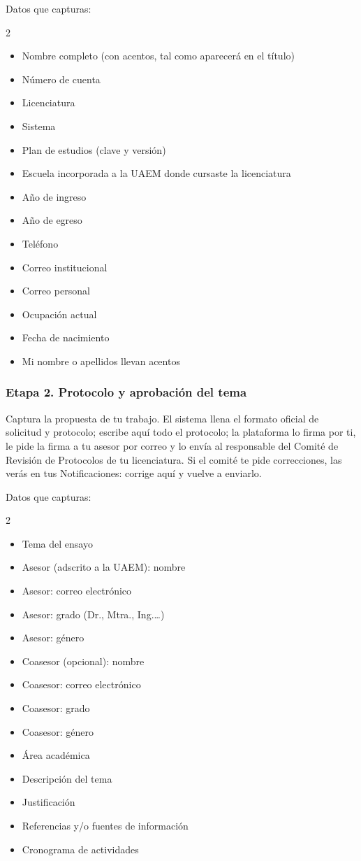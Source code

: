 Datos que capturas:
\begin{multicols}{2}\small
\begin{itemize}
  \item Nombre completo (con acentos, tal como aparecerá en el título)
  \item Número de cuenta
  \item Licenciatura
  \item Sistema
  \item Plan de estudios (clave y versión)
  \item Escuela incorporada a la UAEM donde cursaste la licenciatura
  \item Año de ingreso
  \item Año de egreso
  \item Teléfono
  \item Correo institucional
  \item Correo personal
  \item Ocupación actual
  \item Fecha de nacimiento
  \item Mi nombre o apellidos llevan acentos
\end{itemize}
\end{multicols}
\subsubsection*{Etapa 2. Protocolo y aprobación del tema}
Captura la propuesta de tu trabajo. El sistema llena el formato oficial de solicitud y protocolo; escribe aquí todo el protocolo; la plataforma lo firma por ti, le pide la firma a tu asesor por correo y lo envía al responsable del Comité de Revisión de Protocolos de tu licenciatura. Si el comité te pide correcciones, las verás en tus Notificaciones: corrige aquí y vuelve a enviarlo.

Datos que capturas:
\begin{multicols}{2}\small
\begin{itemize}
  \item Tema del ensayo
  \item Asesor (adscrito a la UAEM): nombre
  \item Asesor: correo electrónico
  \item Asesor: grado (Dr., Mtra., Ing.…)
  \item Asesor: género
  \item Coasesor (opcional): nombre
  \item Coasesor: correo electrónico
  \item Coasesor: grado
  \item Coasesor: género
  \item Área académica
  \item Descripción del tema
  \item Justificación
  \item Referencias y/o fuentes de información
  \item Cronograma de actividades
\end{itemize}
\end{multicols}

